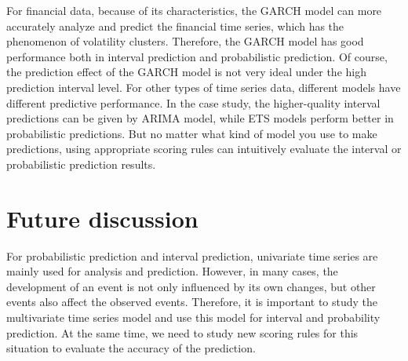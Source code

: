 \documentclass{monashthesis}
\theoremstyle{definition}
\theoremstyle{definition}
\theoremstyle{definition}
\theoremstyle{remark}
\begin{document}
For financial data, because of its characteristics, the GARCH model can
more accurately analyze and predict the financial time series, which has
the phenomenon of volatility clusters. Therefore, the GARCH model has
good performance both in interval prediction and probabilistic
prediction. Of course, the prediction effect of the GARCH model is not
very ideal under the high prediction interval level. For other types of
time series data, different models have different predictive
performance. In the case study, the higher-quality interval predictions
can be given by ARIMA model, while ETS models perform better in
probabilistic predictions. But no matter what kind of model you use to
make predictions, using appropriate scoring rules can intuitively
evaluate the interval or probabilistic prediction results.

\section{Future discussion}\label{future-discussion}

For probabilistic prediction and interval prediction, univariate time
series are mainly used for analysis and prediction. However, in many
cases, the development of an event is not only influenced by its own
changes, but other events also affect the observed events. Therefore, it
is important to study the multivariate time series model and use this
model for interval and probability prediction. At the same time, we need
to study new scoring rules for this situation to evaluate the accuracy
of the prediction.

\printbibliography[heading=bibintoc]
\end{document}
